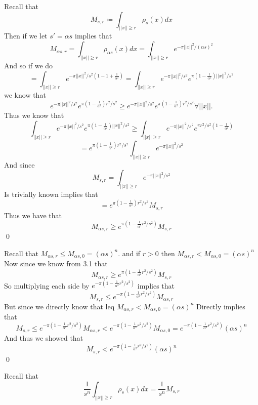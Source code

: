 \documentclass[12pt]{amsart}
\begin{document}
  \begin{problem}
    \begin{subproblem}
      Recall that  
      \[M_{s,r}\coloneq \int_{||x||\geq r}\rho_s(x)dx\]
      Then if we let 
      $s'=\alpha s$ implies that 
      \[M_{\alpha s, r} = \int_{||x||\geq r}\rho_{\alpha s}(x)dx = \int_{||x||\geq r}e^{-\pi ||x||^2/(\alpha s)^2}\]
      And so if we do 
      \[= \int_{||x||\geq r}e^{-\pi ||x||^2/s^2(1-1+\frac{1}{\alpha^2})}=\int_{||x||\geq r}e^{-\pi ||x||^2/s^2}e^{\pi(1-\frac1{\alpha^2})||x||^2/s^2}\]
      we know that 
      \[e^{-\pi ||x||^2/s^2}e^{\pi(1-\frac1{\alpha^2})r^2/s^2} \geq e^{-\pi ||x||^2/s^2}e^{\pi(1-\frac1{\alpha^2})r^2/s^2}\forall ||x||.\]
      Thus we know that 
      \[\int_{||x||\geq r}e^{-\pi ||x||^2/s^2}e^{\pi(1-\frac1{\alpha^2})||x||^2/s^2}\geq \int_{||x||\geq r}e^{-\pi ||x||^2/s^2}e^{\pi r^2/s^2 (1-\frac1{\alpha^2})} \]
      \[= e^{\pi(1-\frac1{\alpha^2})r^2/s^2}\int_{||x||\geq r}e^{-\pi ||x||^2 /s^2}\]
      And since 
      \[M_{s,r}=\int_{||x||\geq r}e^{-\pi ||x||^2 /s^2}\]
      Is trivially known implies that 
      \[=e^{\pi(1-\frac1{\alpha^2})r^2/s^2}M_{s,r}\]
      Thus we have that 
      \[M_{\alpha s, r}\geq e^{\pi(1-\frac1{\alpha^2}r^2/s^2)}M_{s,r}\]\qed
    \end{subproblem} 
    \begin{subproblem}
      Recall that $M_{\alpha s, r}\leq M_{\alpha s, 0} = (\alpha s)^n$. and if $r>0$ then $M_{\alpha s, r}<M_{\alpha s, 0} = (\alpha s)^n$
    Now since we know from 3.1 that 
    \[M_{\alpha s, r}\geq e^{\pi(1-\frac1{\alpha^2}r^2/s^2)}M_{s,r}\]
    So multiplying each side by $e^{-\pi(1-\frac1{\alpha^2}r^2/s^2)}$ implies that 
    \[M_{s,r}\leq e^{-\pi(1-\frac1{\alpha^2}r^2/s^2)}M_{\alpha s, r}\]
    But since we directly know that leq $M_{\alpha s, r}< M_{\alpha s, 0} = (\alpha s)^n$ 
    Directly implies that 
    \[M_{s,r}\leq e^{-\pi(1-\frac1{\alpha^2}r^2/s^2)}M_{\alpha s, r} < e^{-\pi(1-\frac1{\alpha^2}r^2/s^2)}M_{\alpha s, 0} = e^{-\pi(1-\frac1{\alpha^2}r^2/s^2)} (\alpha s)^n\]
    And thus we showed that 
    \[M_{s,r} < e^{-\pi(1-\frac1{\alpha^2}r^2/s^2)} (\alpha s)^n\]\qed
    \end{subproblem}
    \begin{subproblem}
      Recall that 
      \[\frac1{s^n} \int_{||x||\geq r}\rho_s(x)dx = \frac1{s^n}M_{s,r}\] 


\end{subproblem}
\end{problem}
\end{document}
